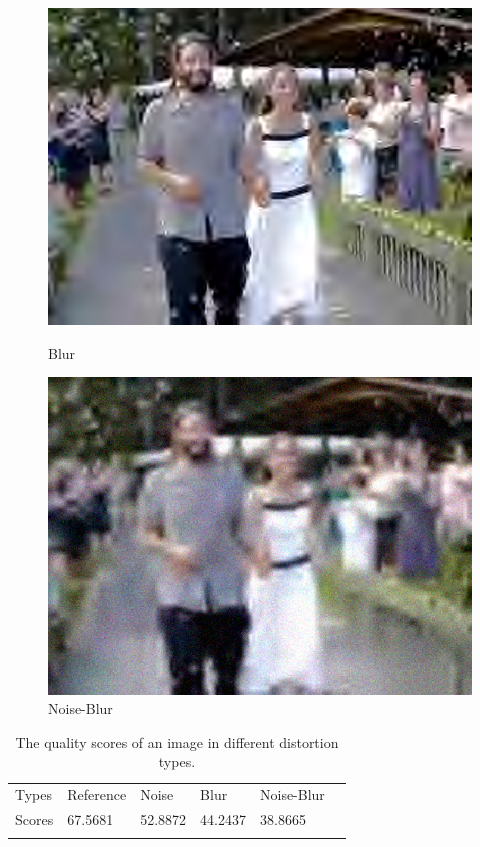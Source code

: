   \begin{figure}
  \includegraphics[width=.8\linewidth]{images/IMAGE1704.eps}  
  \caption{Blur}
  \label{fig:sub-third}
  
  \includegraphics[width=.8\linewidth]{images/IMAGE1721.eps}  
  \caption{Noise-Blur}
  \label{fig:sub-fourth}
  
\end{figure}

\begin{table}
\caption{The quality scores of an image in different distortion types.}
\label{tab:2}       
\begin{tabular}{llllll}
\hline\noalign{\smallskip}
Types & Reference & Noise & Blur & Noise-Blur &  \\
\noalign{\smallskip}\hline\noalign{\smallskip}
Scores				&67.5681    			&52.8872			&44.2437			&38.8665	\\
\noalign{\smallskip}\hline
\end{tabular}
\end{table}






